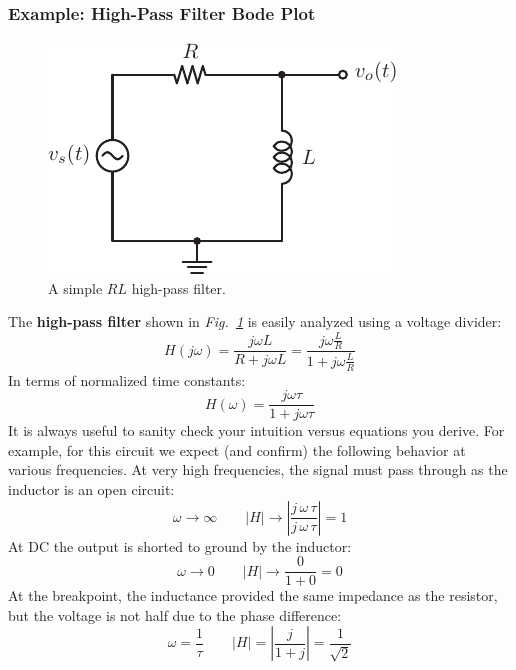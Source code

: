 \subsubsection{Example: High-Pass Filter Bode Plot}
\begin{figure}[tb]
\centering
\includegraphics[angle=-0.0,width=.4\columnwidth]{mod1_3_8_rl_hpf}
\caption{A simple $RL$ high-pass filter.}
\label{fig:hpf}
\end{figure}
The \textbf{high-pass filter} shown in \emph{Fig.~\ref{fig:hpf}}  is easily analyzed using a voltage divider:
    \begin{equation}
        H(j\omega ) = \frac{{j\omega L}}{{R + j\omega L}} = \frac{{j\omega \frac{L}{R}}}{{1 + j\omega \frac{L}{R}}}
    \end{equation}
In terms of normalized time constants:
    \begin{equation}
        H(\omega ) = \frac{{j\omega \tau }}{{1 + j\omega \tau }}
    \end{equation}
It is always useful to sanity check your intuition versus equations you derive.  For example, for this circuit we expect (and confirm) the following behavior at various frequencies.  At very high frequencies, the signal must pass through as the inductor is an open circuit:
    \begin{equation}
        \omega \to \infty \qquad \left| H \right| \to \left| {\frac{j\,\omega\,\tau}{j\,\omega\,\tau}} \right| = 1
    \end{equation}
At DC the output is shorted to ground by the inductor:
    \begin{equation}
        \omega \to 0 \qquad \left| H \right| \to \frac{0}{1 + 0} = 0
    \end{equation}
At the breakpoint, the inductance provided the same impedance as the resistor, but the voltage is not half due to the phase difference:
    \begin{equation}
        \omega = \frac{1}{\tau} \qquad \left| H \right| = \left| {\frac{j}{{1 + j}}} \right| = \frac{1}{\sqrt 2}
    \end{equation}
